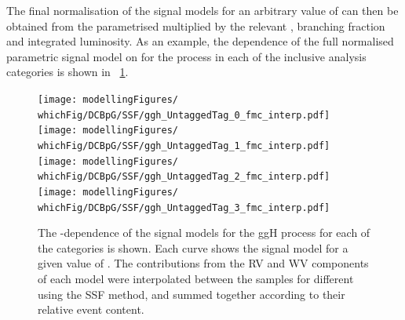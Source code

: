 The final normalisation of the signal models for an arbitrary value of \mH can then be obtained from the parametrised \effxacc multiplied by the relevant \crosssection, branching fraction and integrated luminosity.
As an example, the dependence of the full normalised parametric signal model on \mH for the \ggH process in each of the inclusive analysis categories is shown in \Fig\s~\ref{fig:model:sig_interpolation}.

\begin{figure}[htp!]
\centering
\texttt{[image: modellingFigures/\\whichFig/DCBpG/SSF/ggh\_UntaggedTag\_0\_fmc\_interp.pdf]} 
\texttt{[image: modellingFigures/\\whichFig/DCBpG/SSF/ggh\_UntaggedTag\_1\_fmc\_interp.pdf]} \\ 
\texttt{[image: modellingFigures/\\whichFig/DCBpG/SSF/ggh\_UntaggedTag\_2\_fmc\_interp.pdf]} 
\texttt{[image: modellingFigures/\\whichFig/DCBpG/SSF/ggh\_UntaggedTag\_3\_fmc\_interp.pdf]} \\
\caption{The \mH-dependence of the signal models for the ggH process for each of the \Untagged categories is shown. Each curve shows the signal model for a given value of \mH. The contributions from the RV and WV components of each model were interpolated between the samples for different \mH using the SSF method, and summed together according to their relative event content.}

\label{fig:model:sig_interpolation}
\end{figure}


